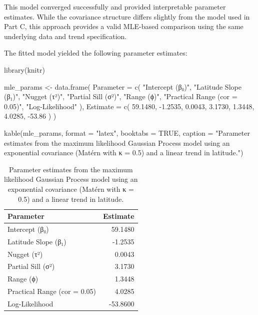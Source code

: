 \documentclass[
  11pt,
]{article}
\newenvironment{Shaded}{\begin{snugshade}}{\end{snugshade}}
\newcommand{\AttributeTok}[1]{\textcolor[rgb]{0.40,0.45,0.13}{#1}}
\newcommand{\ConstantTok}[1]{\textcolor[rgb]{0.56,0.35,0.01}{#1}}
\newcommand{\FloatTok}[1]{\textcolor[rgb]{0.68,0.00,0.00}{#1}}
\newcommand{\FunctionTok}[1]{\textcolor[rgb]{0.28,0.35,0.67}{#1}}
\newcommand{\NormalTok}[1]{\textcolor[rgb]{0.00,0.23,0.31}{#1}}
\newcommand{\OtherTok}[1]{\textcolor[rgb]{0.00,0.23,0.31}{#1}}
\newcommand{\SpecialCharTok}[1]{\textcolor[rgb]{0.37,0.37,0.37}{#1}}
\newcommand{\StringTok}[1]{\textcolor[rgb]{0.13,0.47,0.30}{#1}}
\begin{document}
This model converged successfully and provided interpretable parameter
estimates. While the covariance structure differs slightly from the
model used in Part C, this approach provides a valid MLE-based
comparison using the same underlying data and trend specification.

The fitted model yielded the following parameter estimates:

\begin{Shaded}
\begin{Highlighting}[]
\FunctionTok{library}\NormalTok{(knitr)}

\NormalTok{mle\_params }\OtherTok{\textless{}{-}} \FunctionTok{data.frame}\NormalTok{(}
  \AttributeTok{Parameter =} \FunctionTok{c}\NormalTok{(}
    \StringTok{"Intercept (β₀)"}\NormalTok{,}
    \StringTok{"Latitude Slope (β₁)"}\NormalTok{,}
    \StringTok{"Nugget (τ²)"}\NormalTok{,}
    \StringTok{"Partial Sill (σ²)"}\NormalTok{,}
    \StringTok{"Range (ϕ)"}\NormalTok{,}
    \StringTok{"Practical Range (cor = 0.05)"}\NormalTok{,}
    \StringTok{"Log{-}Likelihood"}
\NormalTok{  ),}
  \AttributeTok{Estimate =} \FunctionTok{c}\NormalTok{(}
    \FloatTok{59.1480}\NormalTok{,}
    \SpecialCharTok{{-}}\FloatTok{1.2535}\NormalTok{,}
    \FloatTok{0.0043}\NormalTok{,}
    \FloatTok{3.1730}\NormalTok{,}
    \FloatTok{1.3448}\NormalTok{,}
    \FloatTok{4.0285}\NormalTok{,}
    \SpecialCharTok{{-}}\FloatTok{53.86}
\NormalTok{  )}
\NormalTok{)}

\FunctionTok{kable}\NormalTok{(mle\_params, }\AttributeTok{format =} \StringTok{"latex"}\NormalTok{, }\AttributeTok{booktabs =} \ConstantTok{TRUE}\NormalTok{,}
      \AttributeTok{caption =} \StringTok{"Parameter estimates from the maximum likelihood Gaussian Process model using an exponential covariance (Matérn with κ = 0.5) and a linear trend in latitude."}\NormalTok{)}
\end{Highlighting}
\end{Shaded}

\begin{table}

\caption{Parameter estimates from the maximum likelihood Gaussian Process model
using an exponential covariance (Matérn with κ = 0.5) and a linear trend
in latitude.}
\centering
\begin{tabular}[t]{lr}
\toprule
Parameter & Estimate\\
\midrule
Intercept (β₀) & 59.1480\\
Latitude Slope (β₁) & -1.2535\\
Nugget (τ²) & 0.0043\\
Partial Sill (σ²) & 3.1730\\
Range (ϕ) & 1.3448\\
\addlinespace
Practical Range (cor = 0.05) & 4.0285\\
Log-Likelihood & -53.8600\\
\bottomrule
\end{tabular}
\end{table}
\end{document}
